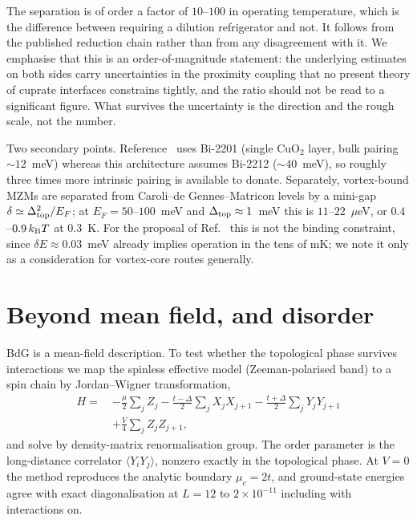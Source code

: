 \documentclass[aps,prb,twocolumn,superscriptaddress,floatfix,nofootinbib]{revtex4-2}
\newcommand{\dtop}{\Delta_{\rm top}}
\newcommand{\kB}{k_{\rm B}}
\begin{document}
The separation is of order a factor of $10$--$100$ in operating temperature,
which is the difference between requiring a dilution refrigerator and not. It
follows from the published reduction chain rather than from any disagreement
with it. We emphasise that this is an order-of-magnitude statement: the
underlying estimates on both sides carry uncertainties in the proximity
coupling that no present theory of cuprate interfaces constrains tightly, and
the ratio should not be read to a significant figure. What survives the
uncertainty is the direction and the rough scale, not the number.

Two secondary points. Reference~\cite{Margalit2022} uses Bi-2201 (single
CuO$_2$ layer, bulk pairing $\sim12$~meV) whereas this architecture assumes
Bi-2212 ($\sim40$~meV), so roughly three times more intrinsic pairing is
available to donate. Separately, vortex-bound MZMs are separated from
Caroli--de Gennes--Matricon levels by a mini-gap
$\delta \simeq \dtop^2/E_F$; at $E_F = 50$--$100$~meV and $\dtop\approx1$~meV
this is $11$--$22$~$\mu$eV, or $0.4$--$0.9\,\kB T$ at $0.3$~K. For the
proposal of Ref.~\cite{Margalit2022} this is not the binding constraint, since
$\delta E \approx 0.03$~meV already implies operation in the tens of mK; we
note it only as a consideration for vortex-core routes generally.

\section{Beyond mean field, and disorder}
\label{sec:dmrg}

BdG is a mean-field description. To test whether the topological phase
survives interactions we map the spinless effective model
(Zeeman-polarised band) to a spin chain by Jordan--Wigner transformation,
%
\begin{align}
H =\ & -\tfrac{\mu}{2}\sum_j Z_j
      - \tfrac{t-\Delta}{2}\sum_j X_j X_{j+1}
      - \tfrac{t+\Delta}{2}\sum_j Y_j Y_{j+1} \nonumber\\
     & + \tfrac{V}{4}\sum_j Z_j Z_{j+1},
\end{align}
%
and solve by density-matrix renormalisation group. The order parameter is the
long-distance correlator $\langle Y_i Y_j\rangle$, nonzero exactly in the
topological phase. At $V=0$ the method reproduces the analytic boundary
$\mu_c = 2t$, and ground-state energies agree with exact diagonalisation at
$L=12$ to $2\times10^{-11}$ including with interactions on.
\end{document}
